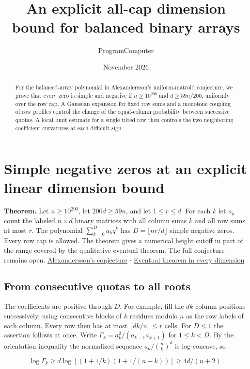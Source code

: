 \documentclass[11pt]{article}
\title{An explicit all-cap dimension bound for balanced binary arrays}
\author{ProgramComputer}
\date{November 2026}
\begin{document}
\maketitle
\begin{abstract}
For the balanced-array polynomial in Alexandersson's uniform-matroid conjecture,
we prove that every zero is simple and negative if $n\ge 10^{200}$ and $d\ge 59n/200$,
uniformly over the row cap. A Gaussian expansion for fixed row sums and a monotone
coupling of row profiles control the change of the equal-column probability between
successive quotas. A local limit estimate for a single tilted row then controls
the two neighboring coefficient curvatures at each difficult sign.
\end{abstract}
\section{Simple negative zeros at an explicit linear dimension bound}

\textbf{Theorem.} Let $n\ge10^{200}$, let $200d\ge59n$, and let $1\le r\le d$. For each $k$ let $a_k$ count the labeled $n\times d$ binary matrices with all column sums $k$ and all row sums at most $r$. The polynomial $\sum_{k=0}^D a_k q^k$ has $D=\lfloor nr/d\rfloor$ simple negative zeros. Every row cap is allowed. The theorem gives a numerical height cutoff in part of the range covered by the qualitative eventual theorem. The full conjecture remains open. \href{https://www.symmetricfunctions.com/realRootedOpenProblems.htm\#conjBalancedArrays}{Alexandersson's conjecture}  $\cdot$  \href{https://github.com/ProgramComputer/open-math-research/blob/main/topics/balanced-arrays/eventual-all/README.md}{Eventual theorem in every dimension}


\subsection{From consecutive quotas to all roots}

The coefficients are positive through $D$. For example, fill the $dk$ column positions successively, using consecutive blocks of $k$ residues modulo $n$ as the row labels of each column. Every row then has at most $\lceil dk/n\rceil\le r$ cells. For $D\le1$ the assertion follows at once. Write $\Gamma_k=a_k^2/(a_{k-1}a_{k+1})$ for $1\le k<D$. By the orientation inequality the normalized sequence $a_k/\binom nk^d$ is log-concave, so

\[
\log\Gamma_k\ge d\log\left[(1+1/k)(1+1/(n-k))\right]\ge4d/(n+2).
\]
\end{document}
